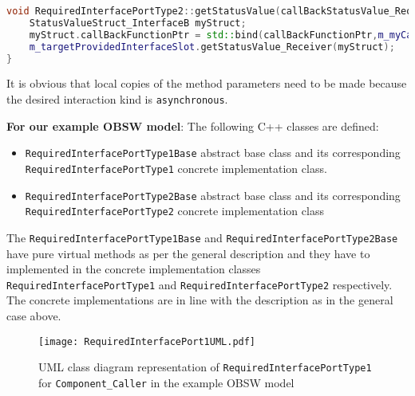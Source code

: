 \begin{Listing}
\begin{lstlisting}[language=C++]
void RequiredInterfacePortType2::getStatusValue(callBackStatusValue_RequiredInterfacePortType2 callBackFunctionPtr) {
	StatusValueStruct_InterfaceB myStruct;
	myStruct.callBackFunctionPtr = std::bind(callBackFunctionPtr,m_myCallerInstance,std::placeholder::_1);
	m_targetProvidedInterfaceSlot.getStatusValue_Receiver(myStruct);
}
\end{lstlisting}
\caption{Code excerpt from the generated code for interface attribute \texttt{StatusValue} access in \texttt{Required\allowbreak InterfacePort\allowbreak Type2}}
\label{Listing: Required interface port2 Impl}
\end{Listing}

It is obvious that local copies of the method parameters need to be made because the desired interaction kind is \texttt{asynchronous}.             

\textbf{For our example OBSW model}: The following C++ classes are defined:
\begin{itemize}
\item \texttt{RequiredInterface\allowbreak PortType1Base} abstract base class and its corresponding \texttt{Required\allowbreak InterfacePort\allowbreak Type1} concrete implementation class.
\item \texttt{RequiredInterface\allowbreak PortType2Base} abstract base class and its corresponding \texttt{Required\allowbreak InterfacePort\allowbreak Type2} concrete implementation class
\end{itemize}

The \texttt{RequiredInterface\allowbreak PortType1Base} and \texttt{RequiredInterface\allowbreak PortType2Base} have pure virtual methods as per the general description and they have to implemented in the concrete implementation classes \texttt{Required\allowbreak InterfacePort\allowbreak Type1} and \texttt{Required\allowbreak InterfacePort\allowbreak Type2} respectively. The concrete implementations are in line with the description as in the general case above.

\begin{figure}[h]
	\centering
	\texttt{[image: RequiredInterfacePort1UML.pdf]}
	\caption{UML class diagram representation of \texttt{Required\allowbreak InterfacePort\allowbreak Type1} for \texttt{Component\allowbreak\_Caller} in the example OBSW model}
	\label{fig: Required interface port1 UML}
\end{figure}

